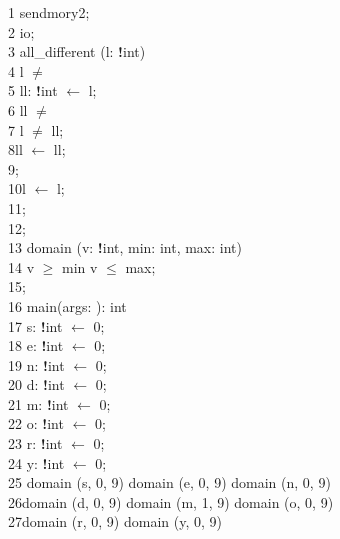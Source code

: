 \begin{appendix}
\begin{Program}
\begin{ttlprog}
1\>\ttlModule{} sendmory2;\\
2\>\ttlImport{} io;\\
3\>\ttlConstraint{} all\_different (l: \ttlList{} \ttlOf{} {\bf!}int)\\
4\>\>\ttlWhile{} \ttlTl{} l $\neq$ \ttlNull{} \ttlDo{}\\
5\>\>\>\ttlVar{} ll: \ttlList{} \ttlOf{} {\bf!}int $\leftarrow$ \ttlTl{} l;\\
6\>\>\>\ttlWhile{} ll $\neq$ \ttlNull{} \ttlDo{}\\
7\>\>\>\>\ttlRequire{} \ttlHd{} l $\neq$ \ttlHd{} ll;\\
8\>\>\>\>ll $\leftarrow$ \ttlTl{} ll;\\
9\>\>\>\ttlEnd{};\\
10\>\>\>l $\leftarrow$ \ttlTl{} l;\\
11\>\>\ttlEnd{};\\
12\>\ttlEnd{};\\
13\>\ttlConstraint{} domain (v: {\bf!}int, min: int, max: int)\\
14\>\>\ttlRequire{} v $\geq$ min \ttlAnd{} v $\leq$ max;\\
15\>\ttlEnd{};\\
16\>\ttlFun{} main(args: \ttlList{} \ttlOf{} \ttlString{}): int\\
17\>\>\ttlVar{} s: {\bf!}int $\leftarrow$ \ttlVar{} 0;\\
18\>\>\ttlVar{} e: {\bf!}int $\leftarrow$ \ttlVar{} 0;\\
19\>\>\ttlVar{} n: {\bf!}int $\leftarrow$ \ttlVar{} 0;\\
20\>\>\ttlVar{} d: {\bf!}int $\leftarrow$ \ttlVar{} 0;\\
21\>\>\ttlVar{} m: {\bf!}int $\leftarrow$ \ttlVar{} 0;\\
22\>\>\ttlVar{} o: {\bf!}int $\leftarrow$ \ttlVar{} 0;\\
23\>\>\ttlVar{} r: {\bf!}int $\leftarrow$ \ttlVar{} 0;\\
24\>\>\ttlVar{} y: {\bf!}int $\leftarrow$ \ttlVar{} 0;\\
25\>\>\ttlRequire{} domain (s, 0, 9) \ttlAnd{} domain (e, 0, 9) \ttlAnd{} domain (n, 0, 9) \ttlAnd{}\\
26\>\>\>domain (d, 0, 9) \ttlAnd{} domain (m, 1, 9) \ttlAnd{} domain (o, 0, 9) \ttlAnd{}\\
27\>\>\>domain (r, 0, 9) \ttlAnd{} domain (y, 0, 9) \ttlAnd{}\\

\end{ttlprog}
\end{Program}
\end{appendix}
